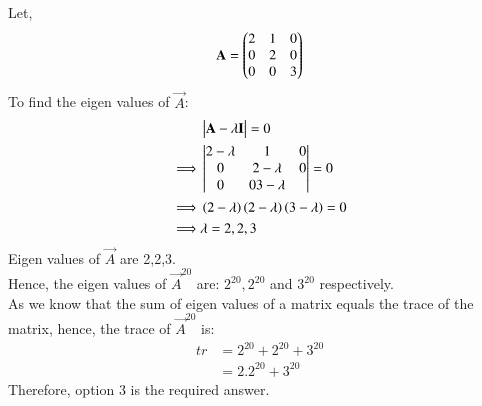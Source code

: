 Let,
\begin{align}
    \mathbf A=\begin{pmatrix}2 &1 & 0\\ 0 & 2 & 0\\0 & 0 & 3\end{pmatrix}
\end{align}
To find the eigen values of $\vec A$:
\begin{align}
    &\begin{vmatrix}\mathbf A - \lambda\mathbf I\end{vmatrix}=0\\
    \implies& \begin{vmatrix}2-\lambda & 1 & 0\\ 0 &2-\lambda & 0\\ 0 &0  3-\lambda\end{vmatrix}= 0\\
    \implies &\left(2-\lambda\right)\left(2-\lambda\right)\left(3-\lambda\right)=0\\
    \implies & \lambda = 2,2,3
\end{align}
Eigen values of $\vec A$ are 2,2,3.\\
Hence, the eigen values of $\vec A^{20}$ are:  $2^{20}, 2^{20}$ and $3^{20}$ respectively.\\
As we know that the sum of eigen values of a matrix equals the trace of the matrix, hence, the trace of $\vec A^{20}$ is:
\begin{align}
    tr &= 2^{20}+ 2^{20}+3^{20}\\
    &= 2. 2^{20} + 3^{20}
\end{align}
Therefore, option 3 is the required answer.

